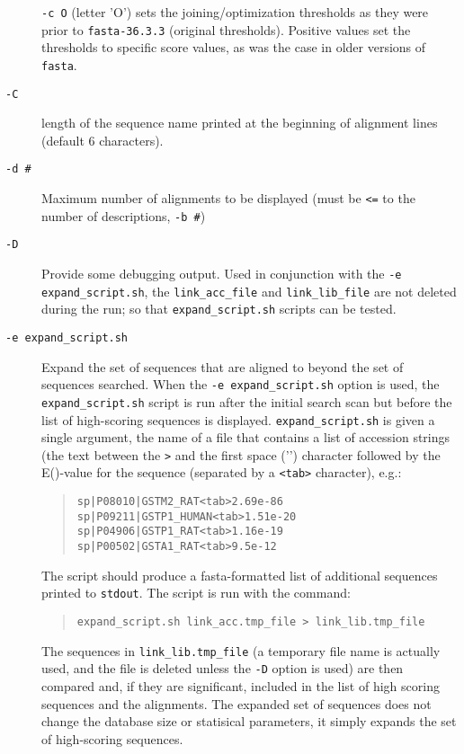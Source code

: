\documentclass[11pt]{article}
\begin{document}
\begin{description}
\texttt{-c O} (letter 'O') sets the joining/optimization
thresholds as they were prior to \texttt{fasta-36.3.3} (original thresholds). Positive
values set the thresholds to specific score values, as was the case
in older versions of \texttt{fasta}.

\item[\texttt{-C}]
length of the sequence name printed at the beginning of alignment
lines (default 6 characters).
\item[\texttt{-d \#}]
Maximum number of alignments to be displayed (must be \texttt{<=} to the number of descriptions, \texttt{-b \#})
\item[\texttt{-D}]
  Provide some debugging output.  Used in conjunction
  with the \texttt{-e expand\_script.sh}, the \texttt{link\_acc\_file}
  and \texttt{link\_lib\_file} are not deleted during the run; so that
  \texttt{expand\_script.sh} scripts can be tested.

\item[\texttt{-e expand\_script.sh}]

  Expand the set of sequences that
  are aligned to beyond the set of sequences searched. When the
  \texttt{-e expand\_script.sh} option is used, the
  \texttt{expand\_script.sh} script is run after the initial search
  scan but before the list of high-scoring sequences is displayed.
  \texttt{expand\_script.sh} is given a single argument, the name of a
  file that contains a list of accession strings (the text between the
  \texttt{>} and the first space ('\textvisiblespace') character
  followed by the E()-value for the sequence (separated by a
  \texttt{<tab>} character), e.g.:
\begin{quote}
\begin{verbatim}
sp|P08010|GSTM2_RAT<tab>2.69e-86
sp|P09211|GSTP1_HUMAN<tab>1.51e-20
sp|P04906|GSTP1_RAT<tab>1.16e-19
sp|P00502|GSTA1_RAT<tab>9.5e-12
\end{verbatim}
\end{quote}
The script should produce a fasta-formatted list of additional
sequences printed to \texttt{stdout}.  The script is run with the command:
\begin{quote}
\begin{verbatim}
expand_script.sh link_acc.tmp_file > link_lib.tmp_file
\end{verbatim}
\end{quote}
The sequences in \texttt{link\_lib.tmp\_file} (a temporary file name is
actually used, and the file is deleted unless the \texttt{-D} option
is used) are then compared and, if they are significant, included in
the list of high scoring sequences and the alignments.  The expanded
set of sequences does not change the database size or statisical
parameters, it simply expands the set of high-scoring sequences.


\end{description}
\end{document}
